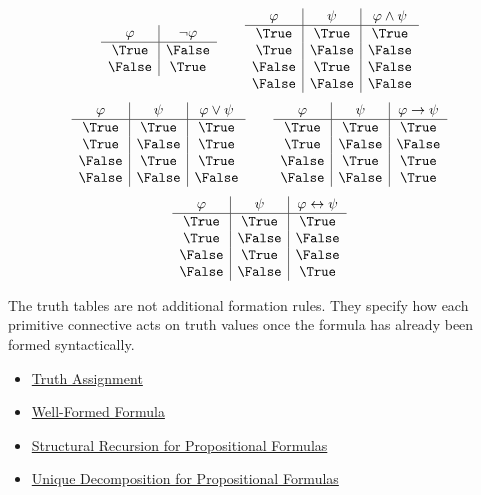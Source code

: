 \begin{remark*}[Examples]
\[
\begin{array}{c|c}
\varphi & \neg\varphi\\
\hline
\True & \False\\
\False & \True
\end{array}
\qquad
\begin{array}{c|c|c}
\varphi & \psi & \varphi\land\psi\\
\hline
\True & \True & \True\\
\True & \False & \False\\
\False & \True & \False\\
\False & \False & \False
\end{array}
\]
\[
\begin{array}{c|c|c}
\varphi & \psi & \varphi\lor\psi\\
\hline
\True & \True & \True\\
\True & \False & \True\\
\False & \True & \True\\
\False & \False & \False
\end{array}
\qquad
\begin{array}{c|c|c}
\varphi & \psi & \varphi\to\psi\\
\hline
\True & \True & \True\\
\True & \False & \False\\
\False & \True & \True\\
\False & \False & \True
\end{array}
\]
\[
\begin{array}{c|c|c}
\varphi & \psi & \varphi\leftrightarrow\psi\\
\hline
\True & \True & \True\\
\True & \False & \False\\
\False & \True & \False\\
\False & \False & \True
\end{array}
\]
\end{remark*}

\begin{remark*}[Examples]
The truth tables are not additional formation rules. They specify how each
primitive connective acts on truth values once the formula has already been
formed syntactically.
\end{remark*}

\begin{dependencies}
\begin{itemize}
  \item \hyperref[def:truth-assignment-propositional-logic]{Truth Assignment}
  \item \hyperref[def:well-formed-formula]{Well-Formed Formula}
  \item \hyperref[thm:structural-recursion-propositional-formulas]{Structural Recursion for Propositional Formulas}
  \item \hyperref[thm:unique-decomposition-propositional-formulas]{Unique Decomposition for Propositional Formulas}
\end{itemize}
\end{dependencies}


